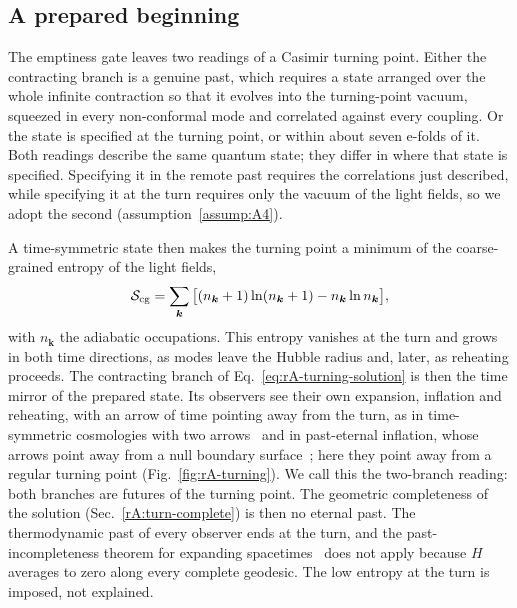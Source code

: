 \subsection{A prepared beginning}
\label{rA:g-beginning}

The emptiness gate leaves two readings of a Casimir turning point.
Either the contracting branch is a genuine past, which requires a state arranged over the whole infinite contraction so that it evolves into the turning-point vacuum, squeezed in every non-conformal mode and correlated against every coupling.
Or the state is specified at the turning point, or within about seven e-folds of it.
Both readings describe the same quantum state; they differ in where that state is specified.
Specifying it in the remote past requires the correlations just described, while specifying it at the turn requires only the vacuum of the light fields, so we adopt the second (assumption~\ref{assump:A4}).

A time-symmetric state then makes the turning point a minimum of the coarse-grained entropy of the light fields,
\begin{equation}
\mathcal S_{\rm cg}=\sum_{\bm k}\big[(n_{\bm k}+1)\ln(n_{\bm k}+1)-n_{\bm k}\ln n_{\bm k}\big],
\end{equation}
with $n_{\bm k}$ the adiabatic occupations.
This entropy vanishes at the turn and grows in both time directions, as modes leave the Hubble radius and, later, as reheating proceeds.
The contracting branch of Eq.~\eqref{eq:rA-turning-solution} is then the time mirror of the prepared state.
Its observers see their own expansion, inflation and reheating, with an arrow of time pointing away from the turn, as in time-symmetric cosmologies with two arrows~\cite{Carroll:2004pn,Barbour:2014bga} and in past-eternal inflation, whose arrows point away from a null boundary surface~\cite{Aguirre:2001ks,Aguirre:2003ck}; here they point away from a regular turning point (Fig.~\ref{fig:rA-turning}).
We call this the two-branch reading: both branches are futures of the turning point.
The geometric completeness of the solution (Sec.~\ref{rA:turn-complete}) is then no eternal past.
The thermodynamic past of every observer ends at the turn, and the past-incompleteness theorem for expanding spacetimes~\cite{BordeGuthVilenkin2003} does not apply because $H$ averages to zero along every complete geodesic.
The low entropy at the turn is imposed, not explained.

